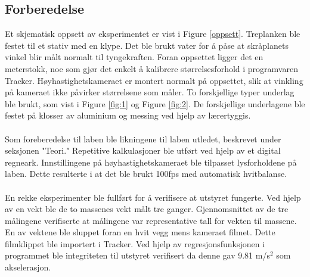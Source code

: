 \documentclass[10pt,a4paper]{report}
\begin{document}
\subsection*{Forberedelse}
Et skjematisk oppsett av eksperimentet er vist i Figure \ref{oppsett}. Treplanken ble festet til et stativ med en klype. Det ble brukt vater for å påse at skråplanets vinkel blir målt normalt til tyngekraften. Foran oppsettet ligger det en meterstokk, noe som gjør det enkelt å kalibrere størrelsesforhold i programvaren Tracker. Høyhastighetskameraet er montert normalt på oppsettet, slik at vinkling på kameraet ikke påvirker størrelsene som måler. To forskjellige typer underlag ble brukt, som vist i Figure \ref{fig:1} og Figure \ref{fig:2}. De forskjellige underlagene ble festet på klosser av aluminium og messing ved hjelp av lærertyggis.\\
\\Som foreberedelse til laben ble likningene til laben utledet, beskrevet under seksjonen "Teori." Repetitive kalkulasjoner ble utført ved hjelp av et digital regneark. Innstillingene på høyhastighetskameraet ble tilpasset lysforholdene på laben. Dette resulterte i at det ble brukt 100fps med automatisk hvitbalanse.\\
\\En rekke eksperimenter ble fullført for å verifisere at utstyret fungerte. Ved hjelp av en vekt ble de to massenes vekt målt tre ganger. Gjennomsnittet av de tre målingene verifiserte at målingene var representative tall for vekten til massene. En av vektene ble sluppet foran en hvit vegg mens kameraet filmet. Dette filmklippet ble importert i Tracker. Ved hjelp av regresjonsfunksjonen i programmet ble integriteten til utstyret verifisert da denne gav 9.81 m/s$^2$ som akselerasjon.
\end{document}
